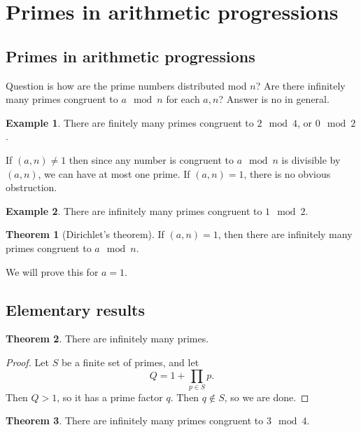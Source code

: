 \documentclass{article}
\newcommand{\rb}[1]{\left( #1 \right)}
\theoremstyle{definition}\newtheorem{definition}{Definition}
\theoremstyle{definition}\newtheorem{remark}[definition]{Remark}
\theoremstyle{definition}\newtheorem*{example}{Example}
\theoremstyle{definition}\newtheorem*{note}{Note}
\newtheorem{theorem}[definition]{Theorem}
\begin{document}
\pagebreak

\section{Primes in arithmetic progressions}

\subsection{Primes in arithmetic progressions}

Question is how are the prime numbers distributed mod $ n $? Are there infinitely many primes congruent to $ a \mod n $ for each $ a, n $? Answer is no in general.

\begin{example}
There are finitely many primes congruent to $ 2 \mod 4 $, or $ 0 \mod 2 $.
\end{example}

If $ \rb{a, n} \ne 1 $ then since any number is congruent to $ a \mod n $ is divisible by $ \rb{a, n} $, we can have at most one prime. If $ \rb{a, n} = 1 $, there is no obvious obstruction.

\begin{example}
There are infinitely many primes congruent to $ 1 \mod 2 $.
\end{example}

\begin{theorem}[Dirichlet's theorem]
If $ \rb{a, n} = 1 $, then there are infinitely many primes congruent to $ a \mod n $.
\end{theorem}

We will prove this for $ a = 1 $.

\subsection{Elementary results}

\begin{theorem}
There are infinitely many primes.
\end{theorem}

\begin{proof}
Let $ S $ be a finite set of primes, and let
$$ Q = 1 + \prod_{p \in S} p. $$
Then $ Q > 1 $, so it has a prime factor $ q $. Then $ q \notin S $, so we are done.
\end{proof}

\begin{theorem}
There are infinitely many primes congruent to $ 3 \mod 4 $.
\end{theorem}
\end{document}
